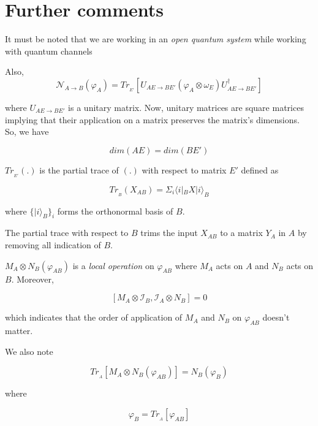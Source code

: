 \documentclass{article}
\begin{document}
\section{Further comments}

\begin{description}
	
	\item It must be noted that we are working in an \emph{open quantum system} while working with quantum channels
	
	\item Also,
	\[ \mathcal{N}_{A \rightarrow B}(\varphi_A) = Tr_{_{E'}}[U_{AE \rightarrow BE'} (\varphi_A \otimes \omega_E) U_{AE \rightarrow BE'}^{\dagger} ]\]
	
	where $U_{AE \rightarrow BE'}$ is a unitary matrix. Now, unitary matrices are square matrices implying that their application on a matrix preserves the matrix's dimensions. So, we have
	
	\[dim(AE) = dim(BE')\]
	
	$Tr_{_{E'}}(.)$ is the partial trace of $(.)$ with respect to matrix $E'$ defined as
	
	\[ Tr_{_{B}}(X_{AB}) = \Sigma_i \langle i |_{B} X | i \rangle_{B} \]
	
	where $\{ | i \rangle_{B} \}_i$ forms the orthonormal basis of $B$.
	
	The partial trace with respect to $B$ trims the input $X_{AB}$ to a matrix $Y_A$ in $A$ by removing all indication of $B$.
	
	\item $M_A \otimes N_B (\varphi_{AB})$  is a \emph{local operation} on $\varphi_{AB}$ where $M_A$ acts on $A$ and $N_B$ acts on $B$. Moreover,
	
	\[ [ M_A \otimes \mathcal{I}_B, \mathcal{I}_A \otimes N_B ] = 0 \]
	
	which indicates that the order of application of $M_A$ and $N_B$ on $\varphi_{AB}$ doesn't matter.
	
	\item We also note
	
	\[ Tr_{_A}[M_A \otimes N_B (\varphi_{AB})] = N_B(\varphi_B) \]
	
	where
	
	\[ \varphi_B = Tr_{_A}[\varphi_{AB}] \]
	
\end{description}
\end{document}
